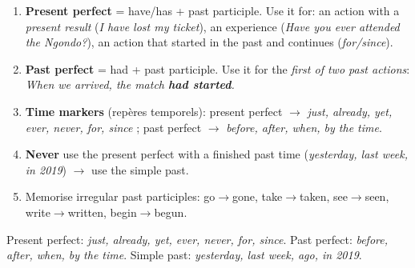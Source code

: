 \documentclass[11pt]{article}
\newcommand{\cle}[1]{{\popxbold\color{popdark}#1}}
\begin{document}
\begin{methode}
\begin{enumerate}
\item \textbf{Present perfect} = \cle{have/has + past participle}. Use it for: an action with a \emph{present result} (\emph{I have lost my ticket}), an experience (\emph{Have you ever attended the Ngondo?}), an action that started in the past and continues (\emph{for/since}).
\item \textbf{Past perfect} = \cle{had + past participle}. Use it for the \emph{first of two past actions}: \emph{When we arrived, the match \textbf{had started}.}
\item \textbf{Time markers} (repères temporels): present perfect $\rightarrow$ \emph{just, already, yet, ever, never, for, since} ; past perfect $\rightarrow$ \emph{before, after, when, by the time}.
\item \textbf{Never} use the present perfect with a finished past time (\emph{yesterday, last week, in 2019}) $\rightarrow$ use the simple past.
\item Memorise irregular past participles: go$\rightarrow$gone, take$\rightarrow$taken, see$\rightarrow$seen, write$\rightarrow$written, begin$\rightarrow$begun.
\end{enumerate}
\begin{aretenir}
Present perfect: \emph{just, already, yet, ever, never, for, since}. Past perfect: \emph{before, after, when, by the time}. Simple past: \emph{yesterday, last week, ago, in 2019}.
\end{aretenir}
\end{methode}
\end{document}
